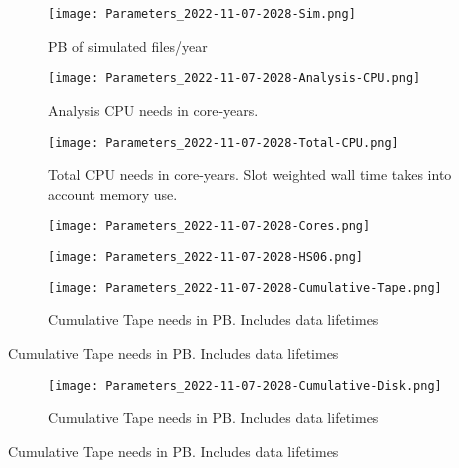 \documentclass[12pt,landscape]{article}
\begin{document}
\begin{figure}[ht]
\centering\texttt{[image: Parameters\_2022-11-07-2028-Sim.png]}\label{Sim}
\caption{PB of simulated files/year}
\end{figure}
\begin{figure}[ht]
\centering\texttt{[image: Parameters\_2022-11-07-2028-Analysis-CPU.png]}\label{Analysis-CPU}
\caption{Analysis CPU needs in core-years.}
\end{figure}
\begin{figure}[ht]
\centering\texttt{[image: Parameters\_2022-11-07-2028-Total-CPU.png]}\label{Total-CPU}
\caption{Total CPU needs in core-years. Slot weighted wall time takes into account memory use.}
\end{figure}
\begin{figure}[ht]
\centering\texttt{[image: Parameters\_2022-11-07-2028-Cores.png]}\label{Cores}
\caption{}
\end{figure}
\begin{figure}[ht]
\centering\texttt{[image: Parameters\_2022-11-07-2028-HS06.png]}\label{HS06}
\caption{}
\end{figure}
\begin{figure}[ht]
\centering\texttt{[image: Parameters\_2022-11-07-2028-Cumulative-Tape.png]}\label{Cumulative-Tape}
\caption{Cumulative Tape needs in PB. Includes data lifetimes}
\end{figure}
\begin{table}[h]
\centering{}\label{Cumulative-Tape
}
\caption{Cumulative Tape needs in PB. Includes data lifetimes}
\end{table}
\begin{figure}[ht]
\centering\texttt{[image: Parameters\_2022-11-07-2028-Cumulative-Disk.png]}\label{Cumulative-Disk}
\caption{Cumulative Tape needs in PB. Includes data lifetimes}
\end{figure}
\begin{table}[h]
\centering{}\label{Cumulative-Disk
}
\caption{Cumulative Tape needs in PB. Includes data lifetimes}
\end{table}

\end{document}
